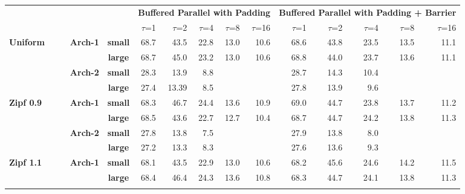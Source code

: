 \documentclass[10pt, conference, compsocconf]{IEEEtran}
\begin{document}
\begin{table}[htbp]
	\centering
	{\def\arraystretch{1.3}
		\begin{tabular}{ccccc||rrrrr|rrrrr}  
			&&&&                 & \multicolumn{5}{c|}{\textbf{Buffered Parallel with Padding}} & \multicolumn{5}{c}{\textbf{Buffered Parallel with Padding + Barrier}} \\
			&&&&                 & $\tau$=1   & $\tau$=2    & $\tau$=4    & $\tau$=8    & $\tau$=16  & $\tau$=1   & $\tau$=2   & $\tau$=4   & $\tau$=8   & $\tau$=16 \\ \hline
						
			\multicolumn{1}{l}{\multirow{4}{*}{\textbf{Uniform}}}
			&&&\multirow{2}{*}{\textbf{Arch-1}} & \textbf{small}  & 68.7    & 43.5   & 22.8   & 13.0   & 10.6   & 68.6    & 43.8    & 23.5   & 13.5   & 11.1   \\
			&&&& \textbf{large} & 68.7    & 45.0   & 23.2   &   13.0 & 10.6   &  68.8 &	44.0 &	23.7	& 13.6	& 11.1 \\ \cline{2-15}
			
			&&&\multirow{2}{*}{\textbf{Arch-2}} & \textbf{small}  & 28.3    & 13.9   & 8.8   &        &       &  28.7    &  14.3   & 10.4   &        &       \\
			&&&& \textbf{large} &  27.4      &   13.39     &       8.5 &        &       &     27.8    &     13.9    &     9.6   &        &   \\ \hline \hline 
			
			\multicolumn{1}{l}{\multirow{4}{*}{\textbf{Zipf 0.9}}}
			&&&\multirow{2}{*}{\textbf{Arch-1}} & \textbf{small}  & 68.3    & 46.7   & 24.4   & 13.6   & 10.9   & 69.0    & 44.7    & 23.8   & 13.7   & 11.2   \\
			&&&& \textbf{large} & 68.5    & 43.6   & 22.7   &   12.7 & 10.4   &  68.7 &	44.7 &	24.2	& 13.8	& 11.3 \\ \cline{2-15}
			
			&&&\multirow{2}{*}{\textbf{Arch-2}} & \textbf{small}  & 27.8    & 13.8   & 7.5   &        &       &  27.9    &  13.8   & 8.0   &        &       \\
			&&&& \textbf{large} &  27.2      &   13.3     &       8.3 &        &       &     27.6   &     13.6    &     9.3   &        &   \\ \hline  
			\multicolumn{1}{l}{\multirow{4}{*}{\textbf{Zipf 1.1}}}
			&&&\multirow{2}{*}{\textbf{Arch-1}} & \textbf{small}  & 68.1    & 43.5   & 22.9   & 13.0   & 10.6   & 68.2    & 45.6    & 24.6   & 14.2   & 11.5   \\
			&&&& \textbf{large} & 68.4    & 46.4   & 24.3   &   13.6 & 10.8   &  68.3 &	44.7 &	24.1	& 13.8	& 11.3 \\ \cline{2-15}
			

\end{tabular}}
\end{table}
\end{document}
